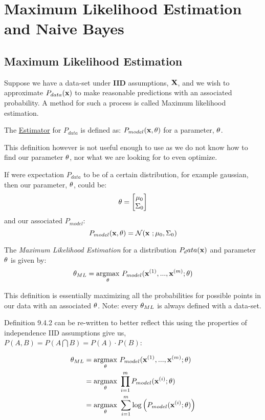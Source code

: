 

\chapter{Maximum Likelihood Estimation and Naive Bayes}
\label{Maximum Likelihood estimation}

\section{Maximum Likelihood Estimation}

Suppose we have a data-set under \textbf{IID} assumptions, $\MX$, and we wish to approximate $P_{data}(\vx)$ to make reasonable predictions with an associated probability. A method for such a process is called Maximum likelihood estimation. \\

\begin{definition}
    The \underline{Estimator} for $P_{data}$ is defined as: $P_{model}(\vx,\vtheta)$ for a parameter, $\vtheta$. 
\end{definition}

This definition however is not useful enough to use as we do not know how to find our parameter $\vtheta$, nor what we are looking for to even optimize. \\

\begin{example}
    If were expectation $P_{data}$ to be of a certain distribution, for example gaussian, then our parameter, $\vtheta$, could be: 
    $$\vtheta = \begin{bmatrix} \mu_0 \\ \Sigma_0 \end{bmatrix}$$
    and our associated $P_{model}$:
    $$P_{model}(\vx,\vtheta) = \Normal(\vx\ ;\mu_0, \Sigma_0)$$
\end{example}

\begin{definition}
    The \textit{Maximum Likelihood Estimation} for a distribution $P_data(\vx)$ and parameter $\vtheta$ is given by:
    $$\vtheta_{ML} = \underset{\vtheta}{\argmax}\ P_{model}(\vx^{(1)},...,\vx^{(m)};\vtheta)$$
\end{definition}
\newpage
This definition is essentially maximizing all the probabilities for possible points in our data with an associated $\vtheta$. Note: every $\vtheta_{ML}$ is always defined with a data-set. 
\begin{example}
    
    Definition 9.4.2 can be re-written to better reflect this using the properties of independence IID assumptions give us, $P(A,B) = P(A\bigcap B) = P(A)\cdot P(B)$: 

    \begin{align*}
       \vtheta_{ML} &= \underset{\vtheta}{\argmax}\ P_{model}(\vx^{(1)},...,\vx^{(m)};\vtheta) \\
      & = \underset{\vtheta}{\argmax}\ \prod_{i=1}^m P_{model}(\vx^{(i)};\vtheta) \\
      & = \underset{\vtheta}{\argmax}\ \sum_{i=1}^m \log\left(P_{model}(\vx^{(i)};\vtheta)\right)
    \end{align*}
\end{example}

